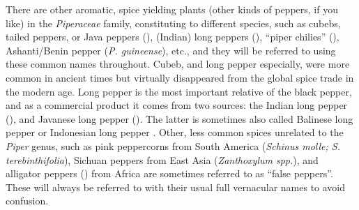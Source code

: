There are other aromatic, spice yielding plants (other kinds of peppers, if you like) in the \textit{Piperaceae} family, constituting to different species, such as cubebs, tailed peppers, or Java peppers (), (Indian) long peppers (), ``piper chilies'' (), Ashanti/Benin pepper (\textit{P. guineense}), etc., and they will be referred to using these common names throughout. Cubeb, and  long pepper especially, were more common in ancient times but virtually disappeared from the global spice trade in the modern age. Long pepper is the most important relative of the black pepper, and as a commercial product it comes from two sources: the Indian long pepper (), and Javanese long pepper (). The latter is sometimes also called Balinese long pepper or Indonesian long pepper . Other, less common spices unrelated to the \textit{Piper} genus, such as pink peppercorns from South America (\textit{Schinus molle; S. terebinthifolia}), Sichuan peppers from East Asia (\textit{Zanthoxylum spp.}), and alligator peppers () from Africa are sometimes referred to as ``false peppers''. These will always be referred to with their usual full vernacular names to avoid confusion.



